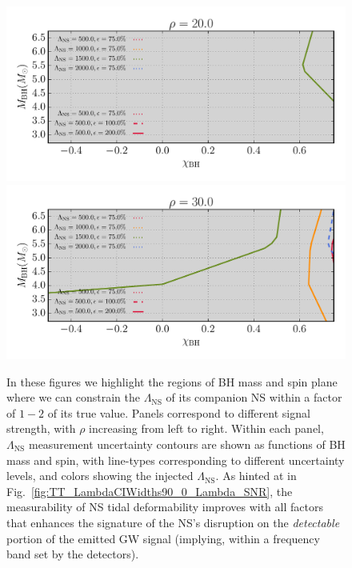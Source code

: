 \documentclass[aps,prd,amsmath,floats,floatfix, twocolumn,
superscriptaddress,nofootinbib,showpacs]{revtex4-1}
\newcommand{\lambdans}{\Lambda_\mathrm{NS}}
\begin{document}
%
\begin{figure}
\centering    
\includegraphics[width=0.9025\columnwidth]{plots/TTLambdaErrorCurves_BHspin_BHmass_SNR20_CI90_0}
\includegraphics[width=0.9025\columnwidth]{plots/TTLambdaErrorCurves_BHspin_BHmass_SNR30_CI90_0}
\caption{In these figures we highlight the regions of BH mass and spin plane 
where we can constrain the $\lambdans$ of its companion NS within a factor of 
$1-2$ of its true value. Panels correspond to different signal strength, with 
$\rho$ increasing from left to right. Within each panel, $\lambdans$ 
measurement uncertainty contours are shown as functions of BH mass and spin,
with line-types corresponding to different uncertainty levels, and colors 
showing the injected $\lambdans$. 
As hinted at in Fig.~\ref{fig:TT_LambdaCIWidths90_0_Lambda_SNR}, the 
measurability of NS tidal deformability improves with all factors that 
enhances the signature of the NS's disruption on the \textit{detectable} 
portion of the emitted GW signal (implying, within a frequency band set by the
detectors).
}
\label{fig:TT_LambdaErrorCurves_BHspin_BHmass_CI90_0}
\end{figure}
%
\end{document}
